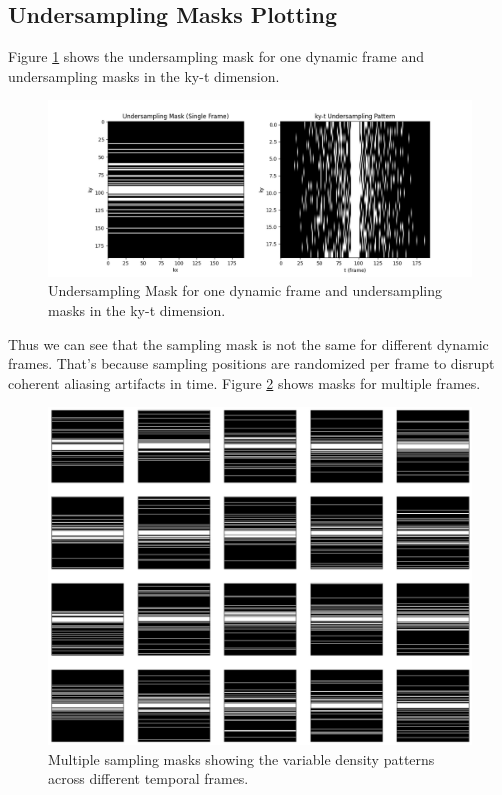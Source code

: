 \documentclass{article}
\begin{document}
\subsection{Undersampling Masks Plotting}
Figure \ref{fig:undersampling_mask} shows the undersampling mask for one dynamic frame and undersampling masks in the ky-t dimension.

\begin{figure}[H]
  \centering
  \includegraphics[width=\linewidth]{../assets/undersampling_mask.png}
  \caption{Undersampling Mask for one dynamic frame and undersampling masks in the ky-t dimension.}
  \label{fig:undersampling_mask}
\end{figure}

Thus we can see that the sampling mask is not the same for different dynamic frames.
That's because sampling positions are randomized per frame to disrupt coherent aliasing artifacts in time. Figure \ref{fig:multiple_masks} shows masks for multiple frames.

\begin{figure}[H]
  \centering
  \includegraphics[width=0.8\linewidth]{../assets/mask.png}
  \caption{Multiple sampling masks showing the variable density patterns across different temporal frames.}
  \label{fig:multiple_masks}
\end{figure}
\end{document}
